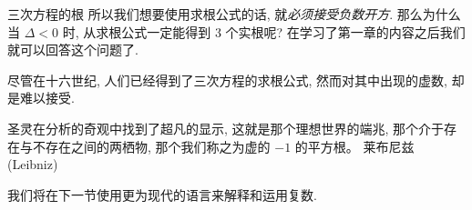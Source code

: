 \begin{frame}{三次方程的根\noexer}
	\onslide<+->
	所以我们想要使用求根公式的话, 就\emph{必须接受负数开方}.
	\onslide<+->
	那么为什么当 $\Delta<0$ 时, 从求根公式一定能得到 $3$ 个实根呢?
	\onslide<+->
	在学习了第一章的内容之后我们就可以回答这个问题了.

	\onslide<+->
	尽管在十六世纪, 人们已经得到了三次方程的求根公式, 然而对其中出现的虚数, 却是难以接受.

	\onslide<+->
	\begin{quote@*}
		圣灵在分析的奇观中找到了超凡的显示, 这就是那个理想世界的端兆, 那个介于存在与不存在之间的两栖物, 那个我们称之为虚的 $-1$ 的平方根。
	\tcblower
	莱布尼兹 (Leibniz)
	\end{quote@*}

	\onslide<+->
	我们将在下一节使用更为现代的语言来解释和运用复数.
\end{frame}
